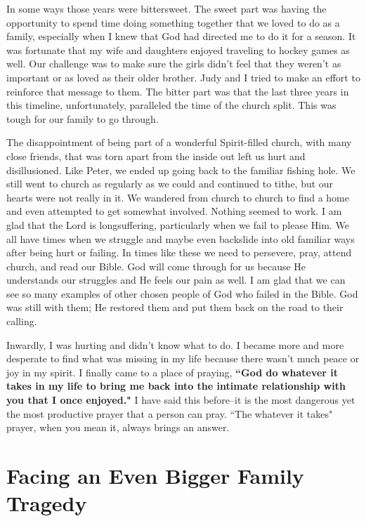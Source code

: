 \documentclass[oneside,12pt]{book}
\begin{document}
In some ways those years were bittersweet. The sweet part was having the opportunity to spend time doing something together that we loved to do as a family, especially when I knew that God had directed me to do it for a season. It was fortunate that my wife and daughters enjoyed traveling to hockey games as well. Our challenge was to make sure the girls didn't feel that they weren't as important or as loved as their older brother. Judy and I tried to make an effort to reinforce that message to them. The bitter part was that the last three years in this timeline, unfortunately, paralleled the time of the church split. This was tough for our family to go through.

The disappointment of being part of a wonderful Spirit-filled church, with many close friends, that was torn apart from the inside out left us hurt and disillusioned. Like Peter, we ended up going back to the familiar fishing hole. We still went to church as regularly as we could and continued to tithe, but our hearts were not really in it. We wandered from church to church to find a home and even attempted to get somewhat involved. Nothing seemed to work. I am glad that the Lord is longsuffering, particularly when we fail to please Him. We all have times when we struggle and maybe even backslide into old familiar ways after being hurt or failing. In times like these we need to persevere, pray, attend church, and read our Bible. God will come through for us because He understands our struggles and He feels our pain as well. I am glad that we can see so many examples of other chosen people of God who failed in the Bible. God was still with them; He restored them and put them back on the road to their calling.

Inwardly, I was hurting and didn't know what to do. I became more and more desperate to find what was missing in my life because there wasn't much peace or joy in my spirit. I finally came to a place of praying, \textbf{``God do whatever it takes in my life to bring me back into the intimate relationship with you that I once enjoyed."} I have said this before--it is the most dangerous yet the most productive prayer that a person can pray. ``The whatever it takes" prayer, when you mean it, always brings an answer.


\section{Facing an Even Bigger Family Tragedy}
\
\end{document}
